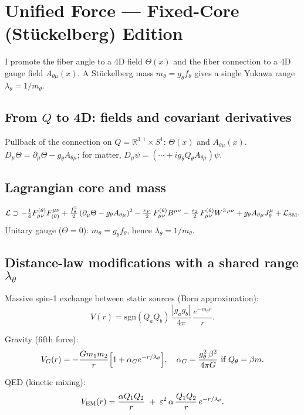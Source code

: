 \section{Unified Force --- Fixed-Core (St\"uckelberg) Edition}\label{sec:unified-force}
I promote the fiber angle to a 4D field $\Theta(x)$ and the fiber connection to a 4D gauge field $A_{\theta\mu}(x)$. A St\"uckelberg mass $m_\theta = g_\theta f_\theta$ gives a single Yukawa range $\lambda_\theta = 1/m_\theta$.

\subsection{From \texorpdfstring{$Q$}{Q} to 4D: fields and covariant derivatives}
Pullback of the connection on $Q=\mathbb R^{3,1}\times S^1$: $\Theta(x)$ and $A_{\theta\mu}(x)$. $D_\mu\Theta = \partial_\mu\Theta - g_\theta A_{\theta\mu}$; for matter, $D_\mu\psi = (\cdots + i g_\theta Q_\theta A_{\theta\mu})\psi$.

\subsection{Lagrangian core and mass}
\begin{equation}
\mathcal{L} \supset -\tfrac14 F^{(\theta)}_{\mu\nu} F_{(\theta)}^{\mu\nu} + \tfrac{f_\theta^2}{2}\,(\partial_\mu \Theta - g_\theta A_{\theta\mu})^2 - \tfrac{\varepsilon_Y}{2}\,F^{(\theta)}_{\mu\nu} B^{\mu\nu} - \tfrac{\varepsilon_2}{2}\,F^{(\theta)}_{\mu\nu} W^{3\,\mu\nu} + g_\theta A_{\theta\mu} J_\theta^\mu + \mathcal{L}_{\rm SM}.
\end{equation}
Unitary gauge ($\Theta=0$): $m_\theta=g_\theta f_\theta$, hence $\lambda_\theta=1/m_\theta$.

\subsection{Distance-law modifications with a shared range \texorpdfstring{$\lambda_\theta$}{lambda-theta}}
Massive spin-1 exchange between static sources (Born approximation):
\[
  V(r) = \mathrm{sgn}(Q_a Q_b)\, \frac{|g_a g_b|}{4\pi}\, \frac{e^{-m_\theta r}}{r}.
\]

Gravity (fifth force):
\[
  V_G(r) = -\frac{G m_1 m_2}{r}\Bigl[1 + \alpha_G e^{-r/\lambda_\theta}\Bigr],
  \quad \alpha_G = \frac{g_\theta^2\,\beta^2}{4\pi G}\ \text{if } Q_\theta=\beta m.
\]

QED (kinetic mixing):
\[
  V_{\rm EM}(r) = \frac{\alpha Q_1 Q_2}{r}\; +\; \varepsilon^2\,\alpha\, \frac{Q_1 Q_2}{r}\, e^{-r/\lambda_\theta}.
\]

